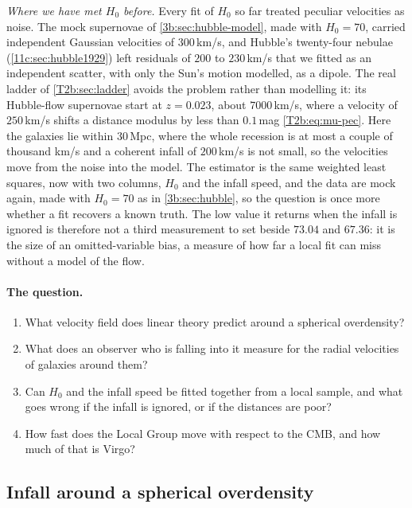 \emph{Where we have met $H_0$ before.} Every fit of $H_0$ so far treated peculiar
velocities as noise. The mock supernovae of \cref{3b:sec:hubble-model}, made with
$H_0=70$, carried independent Gaussian velocities of $300$\,km/s, and Hubble's
twenty-four nebulae (\cref{11c:sec:hubble1929}) left residuals of $200$ to
$230$\,km/s that we fitted as an independent scatter, with only the Sun's motion
modelled, as a dipole. The real ladder of \cref{T2b:sec:ladder} avoids the problem
rather than modelling it: its Hubble-flow supernovae start at $z=0.023$, about
$7000$\,km/s, where a velocity of $250$\,km/s shifts a distance modulus by less than
$0.1$\,mag \eqref{T2b:eq:mu-pec}. Here the galaxies lie within $30$\,Mpc, where the
whole recession is at most a couple of thousand km/s and a coherent infall of
$200$\,km/s is not small, so the velocities move from the noise into the model. The
estimator is the same weighted least squares, now with two columns, $H_0$ and the
infall speed, and the data are mock again, made with $H_0=70$ as in
\cref{3b:sec:hubble}, so the question is once more whether a fit recovers a known
truth. The low value it returns when the infall is ignored is therefore not a third
measurement to set beside $73.04$ and $67.36$: it is the size of an omitted-variable
bias, a measure of how far a local fit can miss without a model of the flow.

\paragraph{The question.}
\begin{enumerate}
  \item What velocity field does linear theory predict around a spherical
        overdensity?
  \item What does an observer who is falling into it measure for the radial
        velocities of galaxies around them?
  \item Can $H_0$ and the infall speed be fitted together from a local sample, and
        what goes wrong if the infall is ignored, or if the distances are poor?
  \item How fast does the Local Group move with respect to the CMB, and how much of
        that is Virgo?
\end{enumerate}

\subsection{Infall around a spherical overdensity}
\label{11c:sec:infall}

